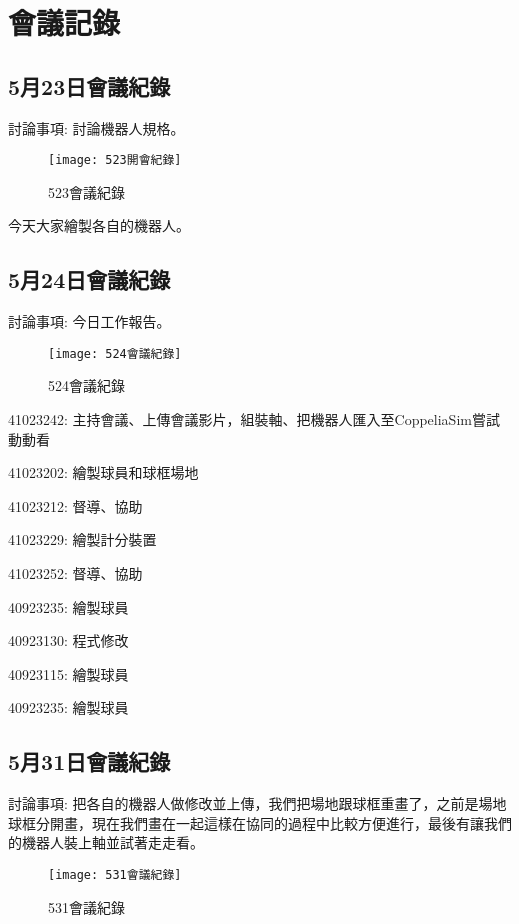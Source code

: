 \chapter{會議記錄}
\section{5月23日會議紀錄}
討論事項: 討論機器人規格。\\

\begin{figure}[hbt!]
\begin{center}
\label{523會議紀錄}
\texttt{[image: 523開會紀錄]}
\caption{\Large 523會議紀錄}
\end{center}
\end{figure}
今天大家繪製各自的機器人。\\

\section{5月24日會議紀錄}
討論事項: 今日工作報告。\\

\begin{figure}[hbt!]
\begin{center}
\label{524會議紀錄}
\texttt{[image: 524會議紀錄]}
\caption{\Large 524會議紀錄}
\end{center}
\end{figure}

41023242: 主持會議、上傳會議影片，組裝軸、把機器人匯入至CoppeliaSim嘗試動動看\

41023202: 繪製球員和球框場地\

41023212: 督導、協助\

41023229: 繪製計分裝置\

41023252: 督導、協助\

40923235: 繪製球員\

40923130: 程式修改\

40923115: 繪製球員\

40923235: 繪製球員\

\section{5月31日會議紀錄}
討論事項: 把各自的機器人做修改並上傳，我們把場地跟球框重畫了，之前是場地球框分開畫，現在我們畫在一起這樣在協同的過程中比較方便進行，最後有讓我們的機器人裝上軸並試著走走看。\\

\begin{figure}[hbt!]
\begin{center}
\label{531會議紀錄}
\texttt{[image: 531會議紀錄]}
\caption{\Large 531會議紀錄}
\end{center}
\end{figure}

\newpage
